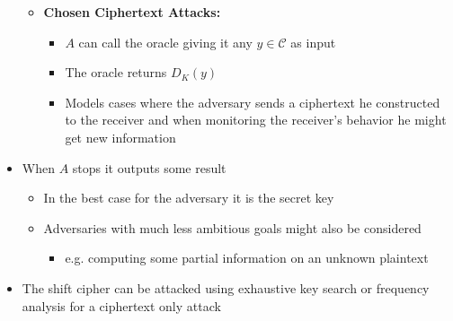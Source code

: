 \begin{itemize}
\begin{itemize}
  	\item \textbf{Chosen Ciphertext Attacks:}
    \begin{itemize}
  		\item $A$ can call the oracle giving it any $y \in \mathcal C$ as input
  		\item The oracle returns $D_K(y)$
  		\item Models cases where the adversary sends a ciphertext he constructed to the receiver and when monitoring the receiver's behavior he might get new information
    \end{itemize}
  \end{itemize}
  \item When $A$ stops it outputs some result
  \begin{itemize}
  	\item In the best case for the adversary it is the secret key
  	\item Adversaries with much less ambitious goals might also be considered
    \begin{itemize}
  		\item e.g. computing some partial information on an unknown plaintext
    \end{itemize}
  \end{itemize}
  \item The shift cipher can be attacked using exhaustive key search or frequency analysis for a ciphertext only attack
\end{itemize}

